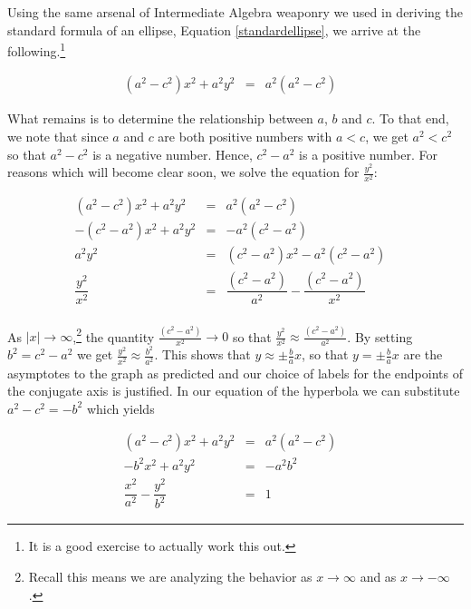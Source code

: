 \documentclass{ximera}
\begin{document}
\medskip

Using the same arsenal of Intermediate Algebra weaponry we used in deriving the standard formula of an ellipse, Equation \ref{standardellipse}, we arrive at the following.\footnote{It is a good exercise to actually work this out.} 

\[ \begin{array}{rclr} \left(a^2 - c^2\right) x^2 +a^2 y^2 & = & a^2 \left(a^2 - c^2\right)  & \end{array}\]

What remains is to determine the relationship between $a$, $b$ and $c$.  To that end, we note that since $a$ and $c$ are both positive numbers with $a < c$, we get $a^2 < c^2$ so that $a^2 - c^2$ is a negative number.  Hence, $c^2 - a^2$ is a positive number.  For reasons which will become clear soon, we solve the equation for $\frac{y^2}{x^2}$:
 
\[ \begin{array}{rclr} \left(a^2 - c^2\right) x^2 +a^2 y^2 & = & a^2 \left(a^2 - c^2\right)  & \\
-\left(c^2 - a^2\right) x^2 +a^2 y^2 & = & -a^2 \left(c^2 - a^2\right)  & \\
a^2 y^2 & = &  \left(c^2 - a^2\right) x^2 -  a^2\left(c^2 - a^2\right)& \\
\dfrac{y^2}{x^2} & = &  \dfrac{\left(c^2 - a^2\right)}{a^2} -  \dfrac{\left(c^2 - a^2\right)}{x^2}& \\ \end{array}\]

As $|x| \rightarrow \infty$,\footnote{Recall this means we are analyzing the behavior as $x \rightarrow \infty$ and as $x \rightarrow -\infty$.}  the quantity $\frac{\left(c^2 - a^2\right)}{x^2} \rightarrow 0$ so that $\frac{y^2}{x^2} \approx  \frac{\left(c^2 - a^2\right)}{a^2}$.  By setting $b^{2} = c^{2} - a^{2}$ we get 
$\frac{y^2}{x^2}  \approx  \frac{b^2}{a^2}$.  This shows that $y  \approx \pm \frac{b}{a} x$, so that $y = \pm \frac{b}{a} x$ are the asymptotes to the graph as predicted and our choice of labels for the endpoints of the conjugate axis is justified.  In our equation of the hyperbola we can substitute $a^2 - c^2 = -b^2$ which yields 

\[ \begin{array}{rclr} \left(a^2 - c^2\right) x^2 +a^2 y^2 & = & a^2 \left(a^2 - c^2\right)  &\\
-b^2 x^2 +a^2 y^2 & = & - a^2 b^2  & \\
\dfrac{x^2}{a^2} - \dfrac{y^2}{b^2} & = & 1 & \end{array} \]
\end{document}
